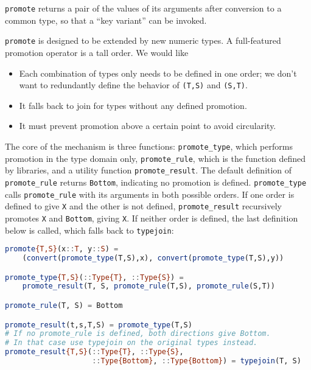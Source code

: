 \noindent
\texttt{promote} returns a pair of the values of its arguments after conversion
to a common type, so that a ``key variant'' can be invoked.

\texttt{promote} is designed to be extended by new numeric types.
A full-featured promotion operator is a tall order.
We would like

\begin{itemize}
\item Each combination of types only needs to be defined in one order; we
don't want to redundantly define the behavior of \texttt{(T,S)} and \texttt{(S,T)}.
\item It falls back to join for types without any defined promotion.
\item It must prevent promotion above a certain point to avoid circularity.
\end{itemize}

The core of the mechanism is three functions: \texttt{promote\_type}, which
performs promotion in the type domain only, \texttt{promote\_rule}, which is
the function defined by libraries, and a utility function \texttt{promote\_result}.
The default definition of \texttt{promote\_rule} returns \texttt{Bottom},
indicating no promotion is defined.
\texttt{promote\_type} calls \texttt{promote\_rule} with its arguments in
both possible orders.
If one order is defined to give \texttt{X} and the other is not defined,
\texttt{promote\_result} recursively promotes \texttt{X} and \texttt{Bottom},
giving \texttt{X}.
If neither order is defined, the last definition below is called, which
falls back to \texttt{typejoin}:

\begin{singlespace}
\begin{lstlisting}[language=julia]
promote{T,S}(x::T, y::S) =
    (convert(promote_type(T,S),x), convert(promote_type(T,S),y))

promote_type{T,S}(::Type{T}, ::Type{S}) =
    promote_result(T, S, promote_rule(T,S), promote_rule(S,T))

promote_rule(T, S) = Bottom

promote_result(t,s,T,S) = promote_type(T,S)
# If no promote_rule is defined, both directions give Bottom.
# In that case use typejoin on the original types instead.
promote_result{T,S}(::Type{T}, ::Type{S},
                    ::Type{Bottom}, ::Type{Bottom}) = typejoin(T, S)
\end{lstlisting}
\end{singlespace}

